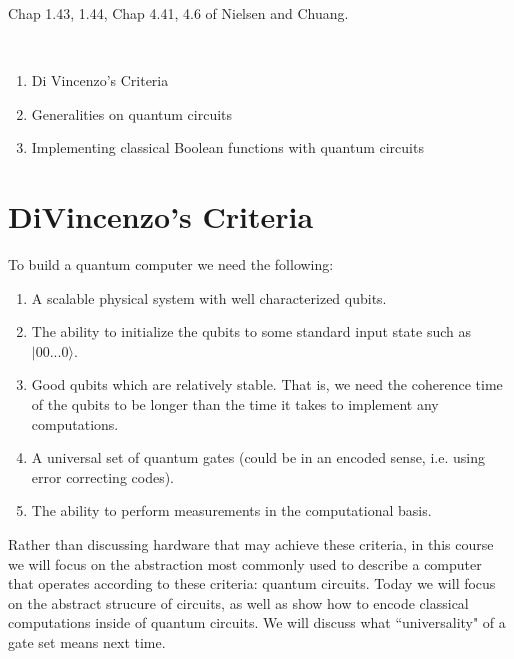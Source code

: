 \documentclass{article}
\date{January 2024}
\begin{document}
\noindent
{}

\vspace{.3cm}

 Chap 1.43, 1.44, Chap 4.41, 4.6 of Nielsen and Chuang. 

\

\begin{enumerate}
     \item Di Vincenzo's Criteria
     \item Generalities on quantum circuits
	\item Implementing classical Boolean functions with quantum circuits
     \end{enumerate}

\section{DiVincenzo's Criteria}

To build a quantum computer we need the following:

\begin{enumerate}
    \item A scalable physical system with well characterized qubits.
    \item The ability to initialize the qubits to some standard input state such as $|00...0\rangle$.
    \item Good qubits which are relatively stable.  That is, we need the coherence time of the qubits to be longer than the time it takes to implement any computations.
    \item A universal set of quantum gates (could be in an encoded sense, i.e. using error correcting codes).
    \item The ability to perform measurements in the computational basis.
\end{enumerate}

Rather than discussing hardware that may achieve these criteria, in this course we will focus on the abstraction most commonly used to describe a computer that operates according to these criteria: quantum circuits.  Today we will focus on the abstract strucure of circuits, as well as show how to encode classical computations inside of quantum circuits.  We will discuss what ``universality" of a gate set means next time.
\end{document}
